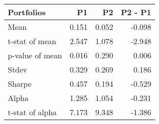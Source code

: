 \begin{tabular}{lrrr}
\toprule
Portfolios & P1 & P2 & P2 - P1 \\
\midrule
Mean & 0.151 & 0.052 & -0.098 \\
t-stat of mean & 2.547 & 1.078 & -2.948 \\
p-value of mean & 0.016 & 0.290 & 0.006 \\
Stdev & 0.329 & 0.269 & 0.186 \\
Sharpe & 0.457 & 0.194 & -0.529 \\
Alpha & 1.285 & 1.054 & -0.231 \\
t-stat of alpha & 7.173 & 9.348 & -1.386 \\
\bottomrule
\end{tabular}
